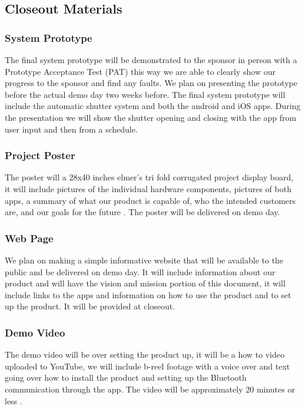 \subsection{Closeout Materials}
\subsubsection{System Prototype}
The final system prototype will be demonstrated to the sponsor in person with a Prototype Acceptance Test (PAT) this way we are able to clearly show our progress to the sponsor and find any faults. We plan on presenting the prototype before the actual demo day two weeks before. The final system prototype will include the automatic shutter system and both the android and iOS apps. During the presentation we will show the shutter opening and closing with the app from user input and then from a schedule.

\subsubsection{Project Poster}
The poster will a 28x40 inches elmer's tri fold corrugated project display board, it will include pictures of the individual hardware components, pictures of both apps, a summary of what our product is capable of, who the intended customers are, and our goals for the future . The poster will be delivered on demo day. 

\subsubsection{Web Page}
We plan on making a simple informative website that will be available to the public and be delivered on demo day. It will include information about our product and will have the vision and mission portion of this document, it will include links to the apps and information on how to use the product and to set up the product. It will be provided at closeout.


\subsubsection{Demo Video}
The demo video will be over setting the product up, it will be a how to video uploaded to YouTube, we will include b-reel footage with a voice over and text going over how to install the product and setting up the Bluetooth communication through the app. The video will be approximately 20 minutes or less .

